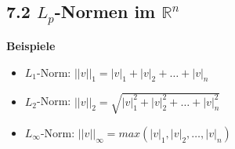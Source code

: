 \subsection{7.2 $L_p$-Normen im $\mathbb{R}^n$}{
\vskip2pt

\begin{center}
\end{center}
\vspace{3pt}

\textbf{Beispiele} \par \vskip1pt
\begin{itemize}[leftmargin=0.29cm, itemsep=0.5pt]
\item $L_1$-Norm: $||v||_1 = |v|_1 + |v|_2 + \hdots + |v|_n$
\item $L_2$-Norm: $||v||_2 = \sqrt{|v|_1^2 + |v|_2^2 + \hdots + |v|_n^2}$
\item $L_\infty$-Norm: $||v||_\infty = max(|v|_1, |v|_2, \hdots, |v|_n)$
\end{itemize}

}
\WhiteSpace